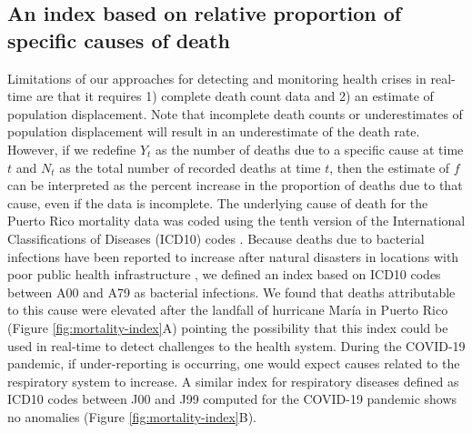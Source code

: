 \documentclass[11pt]{article}
\begin{document}
\subsection{An index based on relative proportion of specific causes of death}
\label{subsec:causes-deaths}

Limitations of our approaches for detecting and monitoring health crises in real-time are that it requires 1) complete death count data and 2) an estimate of population displacement. Note that incomplete death counts or underestimates of population displacement will result in an underestimate of the death rate. However, if we redefine $Y_t$ as the number of deaths due to a specific cause at time $t$ and $N_t$ as the total number of recorded deaths at time $t$, then the estimate of $f$ can be interpreted as the percent increase in the proportion of deaths due to that cause, even if the data is incomplete. The underlying cause of death for the Puerto Rico mortality data was coded using the tenth version of the International Classifications of Diseases (ICD10) codes \cite{world2004icd}. Because deaths due to bacterial infections have been reported to increase after natural disasters in locations with poor public health infrastructure \cite{ligon2006infectious, cook200810th}, we defined an index based on ICD10 codes between A00 and A79 as bacterial infections. We found that deaths attributable to this cause were elevated after the landfall of hurricane Mar\'ia in Puerto Rico (Figure \ref{fig:mortality-index}A) pointing the possibility that this index could be used in real-time to detect challenges to the health system. During the COVID-19 pandemic, if under-reporting is occurring, one would expect causes related to the respiratory system to increase. A similar index for respiratory diseases defined as ICD10 codes between J00 and J99 computed for the COVID-19 pandemic shows no anomalies  (Figure \ref{fig:mortality-index}B).
\end{document}
